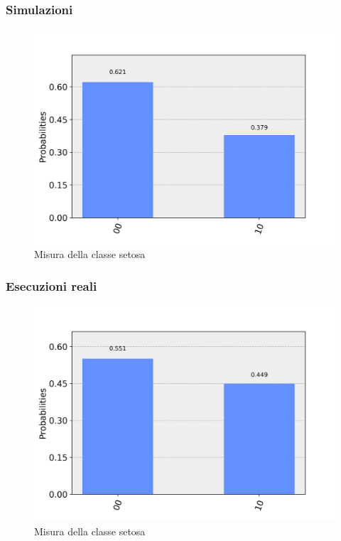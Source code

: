 \documentclass{beamer}
\begin{document}
	\begin{frame}
		\frametitle{Simulazioni}
		\begin{figure}[]
			\centering
			\includegraphics[width=.8\textwidth]{gfx/iris/histogram}
			\caption{Misura della classe setosa}
			\label{fig:setosa_simulazione}
		\end{figure}
	
	\end{frame}

	\begin{frame}
		\frametitle{Esecuzioni reali}
		\begin{figure}[]
			\centering
			\includegraphics[width=.8\textwidth]{gfx/misura_setosa_sperimentale}
			\caption{Misura della classe setosa}
			\label{fig:setosa_sperimentale}
		\end{figure}
	\end{frame}
\end{document}
